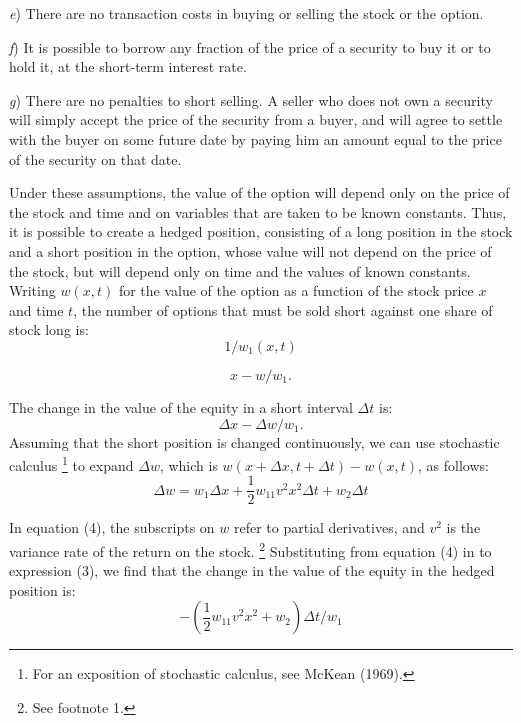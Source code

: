 \documentclass[a4paper, 12pt, twoside]{article}
\begin{document}
\textit{e}) There are no transaction costs in buying or selling the stock or the option.

\textit{f}) It is possible to borrow any fraction of the price of a security to buy it or to 
hold it, at the short-term interest rate.

\textit{g}) There are no penalties to short selling. A seller who does not own a security will 
simply accept the price of the security from a buyer, and will agree to settle with 
the buyer on some future date by paying him an amount equal to the price of the 
security on that date.

Under these assumptions, the value of the option will depend only on the price of the 
stock and time and on variables that are taken to be known constants. Thus, it is 
possible to create a hedged position, consisting of a long position in the stock and a 
short position in the option, whose value will not depend on the price of the stock, 
but will depend only on time and the values of known constants. Writing $w(x,t)$ for the 
value of the option as a function of the stock price $x$ and time $t$, the number of 
options that must be sold short against one share of stock long is:
\begin{equation} 
1/w_1(x,t) %
\end{equation}

\vspace*{1mm}
\begin{equation}
x-w/w_1.
\end{equation}

\vspace*{1mm}
\noindent The change in the value of the equity in a short interval $\Delta t$ is:
\vspace*{1mm}
\begin{equation}
\Delta x-\Delta w/w_1.
\end{equation}
\noindent Assuming that the short position is changed continuously, we can use stochastic 
calculus \footnote{\linespread{1}\fontsize{10}{10}\selectfont
For an exposition of stochastic calculus, see McKean (1969).
}
to expand $\Delta w$, which is $w(x+\Delta x,t+\Delta t)-w(x,t)$, as follows:
\vspace*{1mm}
\begin{equation}
\Delta w=w_1 \Delta x+\frac{1}{2} w_{11} v^2 x^2 \Delta t+w_2 \Delta t
\end{equation}

\vspace*{1mm}
\noindent In equation (4), the subscripts on $w$ refer to partial derivatives, and $v^2$ is the 
variance rate of the return on the stock. \footnote{\linespread{1}\fontsize{10}{10}\selectfont
See footnote 1.
}
Substituting from equation (4) in to 
expression (3), we find that the change in the value of the equity in the hedged 
position is:
\vspace*{1mm}
\begin{equation}
-\left({\displaystyle \frac{1}{2}} w_11 v^2 x^2+w_2 \right)\Delta t/w_1
\end{equation}
\end{document}
